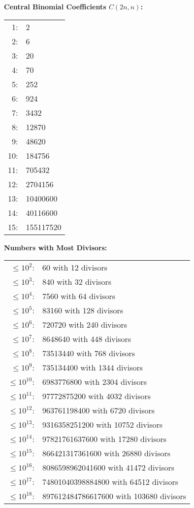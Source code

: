 \vspace{2mm}
\textbf{Central Binomial Coefficients $C(2n,n)$:} \\[1mm]
\begin{tabular}{rl}
1: & 2 \\
2: & 6 \\
3: & 20 \\
4: & 70 \\
5: & 252 \\
6: & 924 \\
7: & 3432 \\
8: & 12870 \\
9: & 48620 \\
10: & 184756 \\
11: & 705432 \\
12: & 2704156 \\
13: & 10400600 \\
14: & 40116600 \\
15: & 155117520 \\
\end{tabular}

\vspace{2mm}
\textbf{Numbers with Most Divisors:} \\[1mm]
\begin{tabular}{rl}
$\leq 10^2$: & 60 with 12 divisors \\
$\leq 10^3$: & 840 with 32 divisors \\
$\leq 10^4$: & 7560 with 64 divisors \\
$\leq 10^5$: & 83160 with 128 divisors \\
$\leq 10^6$: & 720720 with 240 divisors \\
$\leq 10^7$: & 8648640 with 448 divisors \\
$\leq 10^8$: & 73513440 with 768 divisors \\
$\leq 10^9$: & 735134400 with 1344 divisors \\
$\leq 10^{10}$: & 6983776800 with 2304 divisors \\
$\leq 10^{11}$: & 97772875200 with 4032 divisors \\
$\leq 10^{12}$: & 963761198400 with 6720 divisors \\
$\leq 10^{13}$: & 9316358251200 with 10752 divisors \\
$\leq 10^{14}$: & 97821761637600 with 17280 divisors \\
$\leq 10^{15}$: & 866421317361600 with 26880 divisors \\
$\leq 10^{16}$: & 8086598962041600 with 41472 divisors \\
$\leq 10^{17}$: & 74801040398884800 with 64512 divisors \\
$\leq 10^{18}$: & 897612484786617600 with 103680 divisors \\
\end{tabular}